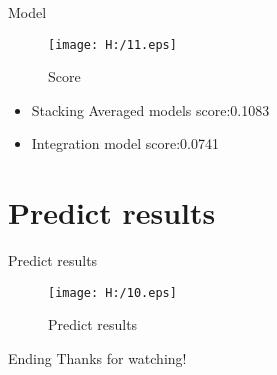 \documentclass[
 size=14pt,
 paper=smartboard,  %
 mode=present, 		%
 display=slides, 	%
 style=tuliplab,  	%
 pauseslide,
 fleqn,leqno]{powerdot}
\begin{document}
\begin{slide}{Model}
    
  \begin{figure}
    \texttt{[image: H:/11.eps]}
    \caption{Score}
    \label{fig:11}
  \end{figure}
  
  \begin{itemize}
    \item
    Stacking Averaged models score:0.1083
    \item
    Integration model score:0.0741
  \end{itemize}

  \end{slide}


\section{Predict results}


\begin{slide}{Predict results}
    
  \begin{figure}
    \texttt{[image: H:/10.eps]}
    \caption{Predict results}
    \label{fig:10}
  \end{figure}
  
  \end{slide}


\begin{wideslide}[toc=,bm=]{Ending}
\centering
{}
\twocolumn[
lcolwidth=0.35\linewidth,
rcolwidth=0.65\linewidth
]
{
}
{
\LARGE Thanks for watching!
}
\end{wideslide}
\end{document}

